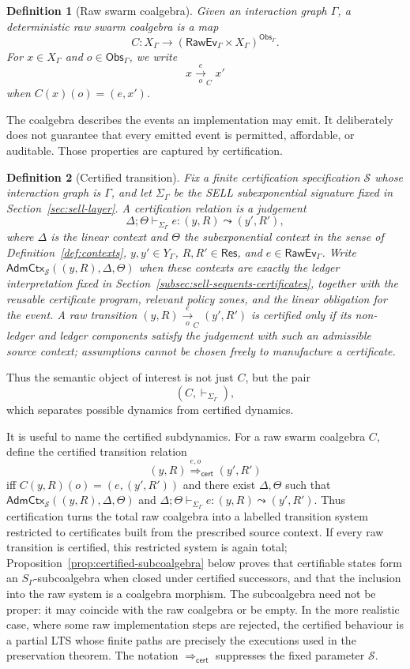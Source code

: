 \documentclass[a4paper,fleqn]{cas-sc}
\newtheorem{definition}{Definition}
\newcommand{\Obs}{\mathsf{Obs}}
\newcommand{\Res}{\mathsf{Res}}
\newcommand{\cert}{\mathsf{cert}}
\newcommand{\RawEv}{\mathsf{RawEv}}
\begin{document}
\begin{definition}[Raw swarm coalgebra]
Given an interaction graph \(\Gamma\), a deterministic raw swarm coalgebra is a map
\[
  C:X_{\Gamma}\to(\RawEv_{\Gamma}\times X_{\Gamma})^{\Obs_{\Gamma}}.
\]
For \(x\in X_{\Gamma}\) and \(o\in\Obs_{\Gamma}\), we write
\[
  x\xrightarrow[o]{e}_{C}x'
\]
when \(C(x)(o)=(e,x')\).
\end{definition}

The coalgebra describes the events an implementation may emit. It deliberately does not guarantee that every emitted event is permitted, affordable, or auditable. Those properties are captured by certification.

\begin{definition}[Certified transition]
Fix a finite certification specification \(\mathcal S\) whose interaction
graph is \(\Gamma\), and let \(\Sigma_{\Gamma}\) be the SELL subexponential
signature fixed in Section~\ref{sec:sell-layer}. A certification relation is a judgement
\[
  \Delta;\Theta\vdash_{\Sigma_{\Gamma}} e:(y,R)\leadsto(y',R'),
\]
where \(\Delta\) is the linear context and \(\Theta\) the subexponential context in the sense of Definition~\ref{def:contexts}, \(y,y'\in Y_{\Gamma}\), \(R,R'\in\Res\), and \(e\in\RawEv_{\Gamma}\). Write \(\mathsf{AdmCtx}_{\mathcal S}((y,R),\Delta,\Theta)\) when these contexts are exactly the ledger interpretation fixed in Section~\ref{subsec:sell-sequents-certificates}, together with the reusable certificate program, relevant policy zones, and the linear obligation for the event. A raw transition \((y,R)\xrightarrow[o]{e}_{C}(y',R')\) is certified only if its non-ledger and ledger components satisfy the judgement with such an admissible source context; assumptions cannot be chosen freely to manufacture a certificate.
\end{definition}

Thus the semantic object of interest is not just \(C\), but the pair
\[
  (C,\vdash_{\Sigma_{\Gamma}}),
\]
which separates possible dynamics from certified dynamics.

It is useful to name the certified subdynamics. For a raw swarm coalgebra \(C\), define the certified transition relation
\[
  (y,R)\overset{e,o}{\Longrightarrow}_{\cert}(y',R')
\]
iff \(C(y,R)(o)=(e,(y',R'))\) and there exist \(\Delta,\Theta\) such that
\(\mathsf{AdmCtx}_{\mathcal S}((y,R),\Delta,\Theta)\) and
\(\Delta;\Theta\vdash_{\Sigma_{\Gamma}}e:(y,R)\leadsto(y',R')\).
Thus certification turns the total raw coalgebra into a labelled transition
system restricted to certificates built from the prescribed source context.
If every raw transition is certified, this restricted system is again total;
Proposition~\ref{prop:certified-subcoalgebra} below proves that certifiable
states form an \(S_{\Gamma}\)-subcoalgebra when closed under certified
successors, and that the inclusion into the raw system is a coalgebra morphism.
The subcoalgebra need not be proper: it may coincide with the raw coalgebra or
be empty. In the more realistic case, where some raw implementation steps are
rejected, the certified behaviour is a partial LTS whose finite paths are
precisely the executions used in the preservation theorem. The notation
\(\Longrightarrow_{\cert}\) suppresses the fixed parameter \(\mathcal S\).
\end{document}
